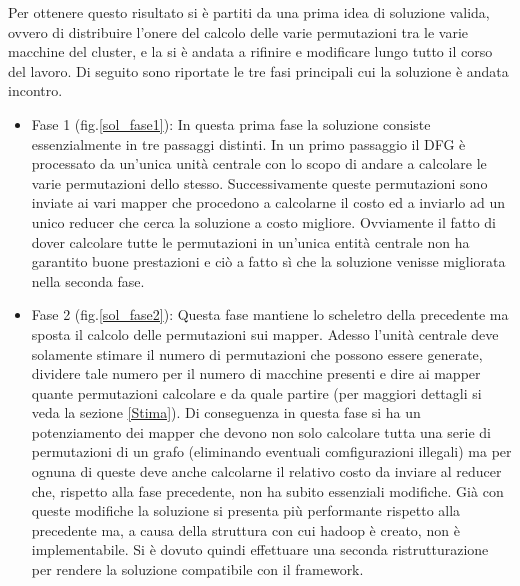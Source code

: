 \documentclass[]{IEEEtran}
\begin{document}
Per ottenere questo risultato si è partiti da una prima idea di soluzione valida, ovvero di distribuire l'onere del calcolo delle varie permutazioni tra le varie macchine del cluster, e la si è andata a rifinire e modificare lungo tutto il corso del lavoro. Di seguito sono riportate le tre fasi principali cui la soluzione è andata incontro.
\begin{itemize}
	\item Fase 1 (fig.\ref{sol_fase1}): In questa prima fase la soluzione consiste essenzialmente in tre passaggi distinti. In un primo passaggio il DFG è processato da un'unica unità centrale con lo scopo di andare a calcolare le varie permutazioni dello stesso. Successivamente queste permutazioni sono inviate ai vari mapper che procedono a calcolarne il costo ed a inviarlo ad un unico reducer che cerca la soluzione a costo migliore. Ovviamente il fatto di dover calcolare tutte le permutazioni in un'unica entità centrale non ha garantito buone prestazioni e ciò a fatto sì che la soluzione venisse migliorata nella seconda fase.
	
	\item Fase 2 (fig.\ref{sol_fase2}): Questa fase mantiene lo scheletro della precedente ma sposta il calcolo delle permutazioni sui mapper. Adesso l'unità centrale deve solamente stimare il numero di permutazioni che possono essere generate, dividere tale numero per il numero di macchine presenti e dire ai mapper quante permutazioni calcolare e da quale partire (per maggiori dettagli si veda la sezione \ref{Stima}). Di conseguenza in questa fase si ha un potenziamento dei mapper che devono non solo calcolare tutta una serie di permutazioni di un grafo (eliminando eventuali comfigurazioni illegali) ma per ognuna di queste deve anche calcolarne il relativo costo da inviare al reducer che, rispetto alla fase precedente, non ha subito essenziali modifiche. Già con queste modifiche la soluzione si presenta più performante rispetto alla precedente ma, a causa della struttura con cui hadoop è creato, non è implementabile. Si è dovuto quindi effettuare una seconda ristrutturazione per rendere la soluzione compatibile con il framework.


\end{itemize}
\end{document}
